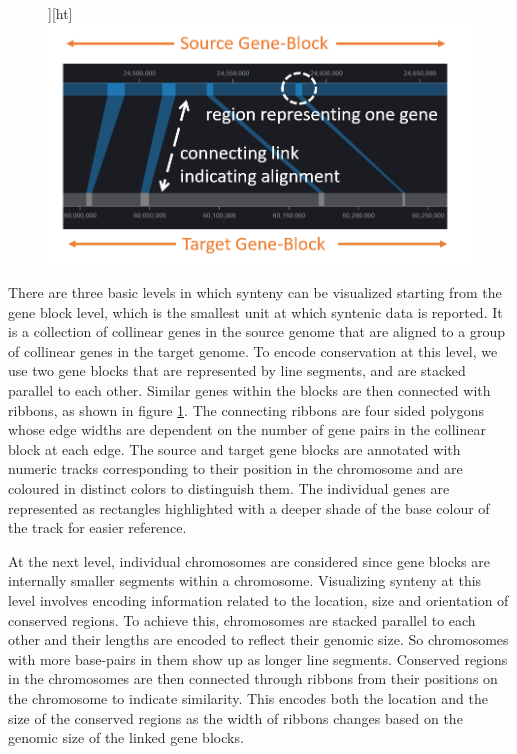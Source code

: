 \begin{figure}][ht]
  \centering
  \includegraphics[width=.50\linewidth]{images/ch_4_link_plot.PNG}
  \label{fig:ch_4_link_plot}
\end{figure}


There are three basic levels in which synteny can be visualized starting from the gene block level, which is the smallest unit at which syntenic data is reported. It is a collection of collinear genes in the source genome that are aligned to a group of collinear genes in the target genome. To encode conservation at this level, we use two gene blocks that are represented by line segments, and are stacked parallel to each other. Similar genes within the blocks are then connected with ribbons, as shown in figure \ref{fig:ch_4_link_plot}. The connecting ribbons are four sided polygons whose edge widths are dependent on the number of gene pairs in the collinear block at each edge. The source and target gene blocks are annotated with numeric tracks corresponding to their position in the chromosome and are coloured in distinct colors to distinguish them. The individual genes are represented as rectangles highlighted with a deeper shade of the base colour of the track for easier reference. 

At the next level, individual chromosomes are considered since gene blocks are internally smaller segments within a chromosome. Visualizing synteny at this level involves encoding information related to the location, size and orientation of conserved regions. To achieve this, chromosomes are stacked parallel to each other and their lengths are encoded to reflect their genomic size. So chromosomes with more base-pairs in them show up as longer line segments. Conserved regions in the chromosomes are then connected through ribbons from their positions on the chromosome to indicate similarity. This encodes both the location and the size of the conserved regions as the width of ribbons changes based on the genomic size of the linked gene blocks.


